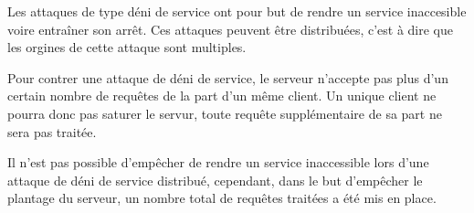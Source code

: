 Les attaques de type déni de service ont pour but de rendre un service inaccesible voire entraîner son arrêt.
Ces attaques peuvent être distribuées, c'est à dire que les orgines de cette attaque sont multiples.

Pour contrer une attaque de déni de service, le serveur n'accepte pas plus d'un certain nombre de requêtes de la part d'un même client. Un unique client ne pourra donc pas saturer le servur, toute requête supplémentaire de sa part ne sera pas traitée.

Il n'est pas possible d'empêcher de rendre un service inaccessible lors d'une attaque de déni de service distribué, cependant, dans le but d'empêcher le plantage du serveur, un nombre total de requêtes traitées a été mis en place.


